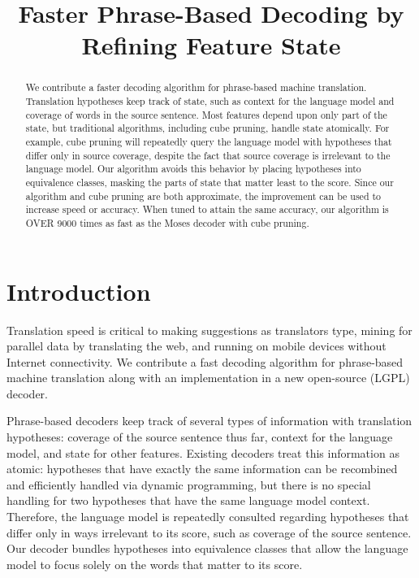 \documentclass[11pt]{article}
\title{Faster Phrase-Based Decoding by Refining Feature State}
\author{}
\date{}
\begin{document}
\maketitle
\begin{abstract}
We contribute a faster decoding algorithm for phrase-based machine translation.  Translation hypotheses keep track of state, such as context for the language model and coverage of words in the source sentence.  Most features depend upon only part of the state, but traditional algorithms, including cube pruning, handle state atomically.  For example, cube pruning will repeatedly query the language model with hypotheses that differ only in source coverage, despite the fact that source coverage is irrelevant to the language model.  
Our algorithm avoids this behavior by placing hypotheses into equivalence classes, masking the parts of state that matter least to the score.  
Since our algorithm and cube pruning are both approximate, the improvement can be used to increase speed or accuracy.  
When tuned to attain the same accuracy, our algorithm is OVER 9000 times as fast as the Moses decoder with cube pruning.  
\end{abstract}

\section{Introduction}
Translation speed is critical to making suggestions as translators type, mining for parallel data by translating the web, and running on mobile devices without Internet connectivity.  We contribute a fast decoding algorithm for phrase-based machine translation along with an implementation in a new open-source (LGPL) decoder.  

Phrase-based decoders \cite{moses,phrasal,jane-phrase} keep track of several types of information with translation hypotheses: coverage of the source sentence thus far, context for the language model, and state for other features.  Existing decoders treat this information as atomic: hypotheses that have exactly the same information can be recombined and efficiently handled via dynamic programming, but there is no special handling for two hypotheses that have the same language model context.  Therefore, the language model is repeatedly consulted regarding hypotheses that differ only in ways irrelevant to its score, such as coverage of the source sentence.  Our decoder bundles hypotheses into equivalence classes that allow the language model to focus solely on the words that matter to its score.  
\end{document}
